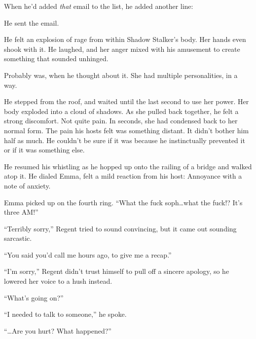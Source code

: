 When he'd added \emph{that} email to the list, he added another line:





He sent the email.



He felt an explosion of rage from within Shadow Stalker's body.  Her hands even shook with it.  He laughed, and her anger mixed with his amusement to create something that sounded unhinged.



Probably was, when he thought about it.  She had multiple personalities, in a way.



He stepped from the roof, and waited until the last second to use her power.  Her body exploded into a cloud of shadows.  As she pulled back together, he felt a strong discomfort.  Not quite pain.  In seconds, she had condensed back to her normal form.  The pain his hosts felt was something distant.  It didn't bother him half as much. He couldn't be sure if it was because he instinctually prevented it or if it was something else.



He resumed his whistling as he hopped up onto the railing of a bridge and walked atop it.  He dialed Emma, felt a mild reaction from his host: Annoyance with a note of anxiety.



Emma picked up on the fourth ring.  ``What the fuck soph\ldots what the fuck!?  It's three AM!''



``Terribly sorry,'' Regent tried to sound convincing, but it came out sounding sarcastic.



``You said you'd call me hours ago, to give me a recap.''



``I'm sorry,'' Regent didn't trust himself to pull off a sincere apology, so he lowered her voice to a hush instead.



``What's going on?''



``I needed to talk to someone,'' he spoke.



``\ldots{}Are you hurt?  What happened?''



